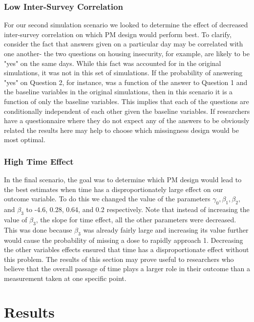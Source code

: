 \documentclass{svjour3}\usepackage[]{graphicx}\usepackage[]{color}
\begin{document}
\subsubsection{Low Inter-Survey Correlation}
For our second simulation scenario we looked to determine the effect of decreased inter-survey correlation on which PM design would perform best. To clarify, consider the fact that answers given on a particular day may be correlated with one another- the two questions on housing insecurity, for example, are likely to be "yes" on the same days. While this fact was accounted for in the original simulations, it was not in this set of simulations. If the probability of answering "yes" on Question 2, for instance, was a function of the answer to Question 1 and the baseline variables in the original simulations, then in this scenario it is a function of only the baseline variables. This implies that each of the questions are conditionally independent of each other given the baseline variables. If researchers have a questionnaire where they do not expect any of the answers to be obviously related the results here may help to choose which missingness design would be most optimal. \par
\subsubsection{High Time Effect}
In the final scenario, the goal was to determine which PM design would lead to the best estimates when time has a disproportionately large effect on our outcome variable. To do this we changed the value of the parameters $\gamma_0, \beta_1, \beta_2,$ and $\beta_3$ to -4.6, 0.28, 0.64, and 0.2 respectively. Note that instead of increasing the value of $\beta_3$, the slope for time effect, all the other parameters were decreased. This was done because $\beta_3$ was already fairly large and increasing its value further would cause the probability of missing a dose to rapidly approach 1. Decreasing the other variables effects ensured that time has a disproportionate effect without this problem. The results of this section may prove useful to researchers who believe that the overall passage of time plays a larger role in their outcome than a measurement taken at one specific point. \par

\section{Results}
\label{sec:3}
\end{document}
